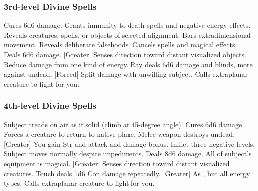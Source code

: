 \subsubsection{3rd-level Divine Spells}
\begin{spelllist}
     Cures 6d6 damage.
     Grants immunity to death spells and negative energy effects.
     Reveals creatures, spells, or objects of selected alignment.
     Bars extradimensional movement.
     Reveals deliberate falsehoods.
     Cancels spells and magical effects.
     Deals 6d6 damage.
    [Greater] Senses direction toward distant visualized objects.
     Reduce damage from one kind of energy.
     Ray deals 6d6 damage and blinds, more against undead.
    [Forced]  Split damage with unwilling subject.
     Calls extraplanar creature to fight for you.
\end{spelllist}

\subsubsection{4th-level Divine Spells}
\begin{spelllist}
     Subject treads on air as if solid (climb at 45-degree angle).
     Cures 6d6 damage.
     Forces a creature to return to native plane.
     Melee weapon destroys undead.
    [Greater] You gain  Str and attack and damage bonus.
     Inflict three negative levels.
     Subject moves normally despite impediments.
     Deals 8d6 damage.
     All of subject's equipment is magical.
    [Greater] Senses direction toward distant visualized creatures.
     Touch deals 1d6 Con damage repeatedly.
    [Greater] As , but all energy types.
     Calls extraplanar creature to fight for you.
\end{spelllist}

